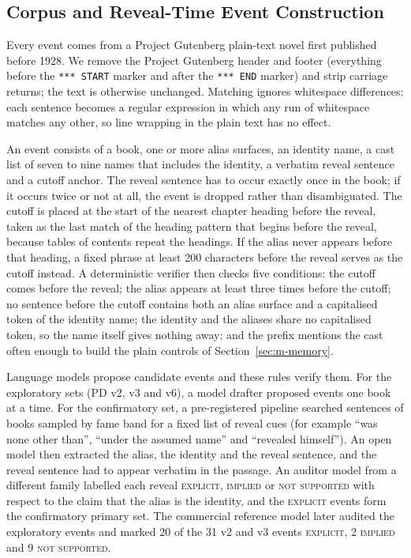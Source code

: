 \documentclass[sn-mathphys]{sn-jnl}%
\theoremstyle{thmstyleone}%
\theoremstyle{thmstyletwo}%
\theoremstyle{thmstylethree}%
\begin{document}
\subsection{Corpus and Reveal-Time Event Construction}\label{sec:m-corpus}

Every event comes from a Project Gutenberg plain-text novel \cite{gutenberg} first published before 1928. We remove the Project Gutenberg header and footer (everything before the \texttt{*** START} marker and after the \texttt{*** END} marker) and strip carriage returns; the text is otherwise unchanged. Matching ignores whitespace differences: each sentence becomes a regular expression in which any run of whitespace matches any other, so line wrapping in the plain text has no effect.

An event consists of a book, one or more alias surfaces, an identity name, a cast list of seven to nine names that includes the identity, a verbatim reveal sentence and a cutoff anchor. The reveal sentence has to occur exactly once in the book; if it occurs twice or not at all, the event is dropped rather than disambiguated. The cutoff is placed at the start of the nearest chapter heading before the reveal, taken as the last match of the heading pattern that begins before the reveal, because tables of contents repeat the headings. If the alias never appears before that heading, a fixed phrase at least 200 characters before the reveal serves as the cutoff instead. A deterministic verifier then checks five conditions: the cutoff comes before the reveal; the alias appears at least three times before the cutoff; no sentence before the cutoff contains both an alias surface and a capitalised token of the identity name; the identity and the aliases share no capitalised token, so the name itself gives nothing away; and the prefix mentions the cast often enough to build the plain controls of Section~\ref{sec:m-memory}.

Language models propose candidate events and these rules verify them. For the exploratory sets (PD v2, v3 and v6), a model drafter proposed events one book at a time. For the confirmatory set, a pre-registered pipeline searched sentences of books sampled by fame band for a fixed list of reveal cues (for example ``was none other than'', ``under the assumed name'' and ``revealed himself''). An open model then extracted the alias, the identity and the reveal sentence, and the reveal sentence had to appear verbatim in the passage. An auditor model from a different family labelled each reveal \textsc{explicit}, \textsc{implied} or \textsc{not supported} with respect to the claim that the alias is the identity, and the \textsc{explicit} events form the confirmatory primary set. The commercial reference model later audited the exploratory events and marked 20 of the 31 v2 and v3 events \textsc{explicit}, 2 \textsc{implied} and 9 \textsc{not supported}.
\end{document}

